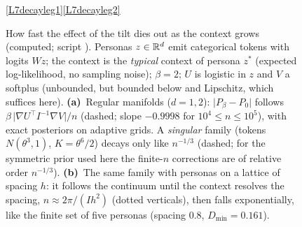 \begin{figure}[tb]
\par\smallskip\ref{L7decayleg1}\hspace{8mm}\ref{L7decayleg2}
\caption{How fast the effect of the tilt dies out as the context grows (computed; script ). Personas $z\in\mathbb{R}^d$ emit categorical tokens with logits $Wz$; the context is the \emph{typical} context of persona $z^*$ (expected log-likelihood, no sampling noise); $\beta=2$; $U$ is logistic in $z$ and $V$ a softplus (unbounded, but bounded below and Lipschitz, which suffices here). \textbf{(a)}~Regular manifolds ($d=1,2$): $\lvert P_\beta-P_0\rvert$ follows $\beta\,\lvert\nabla U^{\top}I^{-1}\nabla V\rvert/n$ (dashed; slope $-0.9998$ for $10^4\le n\le10^5$), with exact posteriors on adaptive grids. A \emph{singular} family (tokens $N(\theta^3,1)$, $K=\theta^6/2$) decays only like $n^{-1/3}$ (dashed; for the symmetric prior used here the finite-$n$ corrections are of relative order $n^{-1/3}$). \textbf{(b)}~The same family with personas on a lattice of spacing $h$: it follows the continuum until the context resolves the spacing, $n\approx2\pi/(Ih^2)$ (dotted verticals), then falls exponentially, like the finite set of five personas (spacing $0.8$, $D_{\min}=0.161$).}
\label{fig:L7-decay}
\end{figure}

